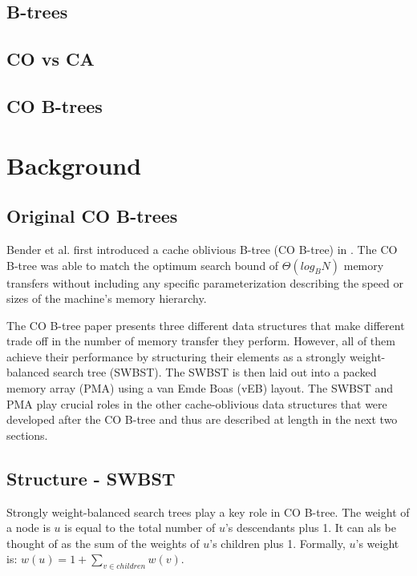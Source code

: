 \documentclass{style}
\begin{document}
\subsection{B-trees}

\subsection{CO vs CA}

\subsection{CO B-trees}

\section{Background}

\subsection{Original CO B-trees}
\label{sec:original}

Bender et al. first introduced a cache oblivious B-tree (CO B-tree) in \cite{cobtree}. The
CO B-tree was able to match the optimum search bound of $\Theta(log_B N)$ memory transfers 
without including any specific parameterization describing the speed or sizes
of the machine's memory hierarchy. 

The CO B-tree paper presents three different data structures that make 
different trade off in the number of memory transfer they perform. However, all of them 
achieve their performance by structuring their elements as a strongly weight-balanced
search tree (SWBST). The SWBST is then laid out into a packed memory array (PMA) 
using a van Emde Boas (vEB) layout. The SWBST and PMA play crucial roles in the
other cache-oblivious data structures that were developed after the CO B-tree and thus are
described at length in the next two sections. 

\subsection{Structure - SWBST}
\label{sec:structure}

Strongly weight-balanced search trees play a key role in CO B-tree. The weight of a node is $u$ is equal to
the total number of $u$'s descendants plus 1. It can als be thought of as the sum of the weights of $u$'s children plus 1.
Formally, $u$'s weight is: $w(u) = 1 + \sum_{v \in children} w(v)$.  
\end{document}
